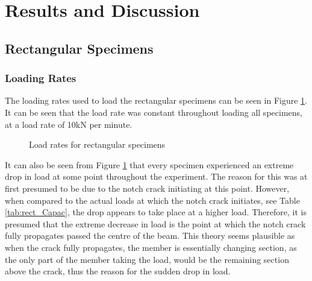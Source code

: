 \documentclass[11pt,a4paper]{article}
\numberwithin{equation}{subsection}
\begin{document}
\section{Results and Discussion}

\subsection{Rectangular Specimens}
\subsubsection{Loading Rates}
The loading rates used to load the rectangular specimens can be seen in Figure \ref{fig:Rect_load}. It can be seen that the load rate was constant throughout loading all specimens, at a load rate of 10kN per minute. 

\begin{figure}[h]
	\begin{center}
	\end{center}
	\caption{Load rates for rectangular specimens}
	\label{fig:Rect_load}
\end{figure}

\noindent
It can also be seen from Figure \ref{fig:Rect_load} that every specimen experienced an extreme drop in load at some point throughout the experiment. The reason for this was at first presumed to be due to the notch crack initiating at this point. However, when compared to the actual loads at which the notch crack initiates, see Table \ref{tab:rect_Capac}, the drop appears to take place at a higher load. Therefore, it is presumed that the extreme decrease in load is the point at which the notch crack fully propagates passed the centre of the beam. This theory seems plausible as when the crack fully propagates, the member is essentially changing section, as the only part of the member taking the load, would be the remaining section above the crack, thus the reason for the sudden drop in load.  
\end{document}
